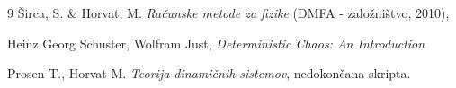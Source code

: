 \documentclass[10pt]{article}
\begin{document}

\begin{thebibliography}{9}
       Širca, S. \& Horvat, M. 
       \emph{Računske metode za fizike} (DMFA - založništvo, 2010),
       
       Heinz Georg Schuster, Wolfram Just, \emph{Deterministic Chaos: An Introduction}
       
       Prosen T., Horvat M.
       \emph{Teorija dinamičnih sistemov}, nedokončana skripta.
\end{thebibliography}
\end{document}
